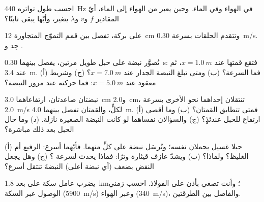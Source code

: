 \begin{exercise}[$\star$]\label{exo:g12:mechanical-waves:4}
احسب طول   تواتره \qty{440}{Hz} في الهواء وفي الماء.
وحين يعبر  من الهواء إلى الماء، أيّ المقادير $f$ و$v$
و$\lambda$ يتغير، وأيّها يبقى ثابتًا؟
\end{exercise}

\begin{exercise}[$\star$]\label{exo:g12:mechanical-waves:5}
على بركة، تفصل بين قمم التموّج المتجاورة \qty{12}{cm} وتتقدم الحلقات
بسرعة \qty{0.30}{m/s}. جِد   و
.
\end{exercise}

\begin{exercise}[$\star\star$]\label{exo:g12:mechanical-waves:6}
تُصوَّر نبضة على حبل طويل مرتين، يفصل بينهما \qty{0.30}{s}: فتقع
قمتها عند $x = \qty{1.0}{m}$، ثم عند \qty{3.4}{m}. (أ) فما السرعة؟
(ب) ومتى تبلغ النبضة الجدار عند $x = \qty{7.0}{m}$؟ (ج) وشريط معقود
عند $x = \qty{5.0}{m}$: فما حركته عند مرور النبضة؟
\end{exercise}

\begin{exercise}[$\star\star$]\label{exo:g12:mechanical-waves:7}
نبضتان صاعدتان، ارتفاعاهما \qty{3.0}{cm} و\qty{2.0}{cm}، تنتقلان
إحداهما نحو الأخرى بسرعة \qty{2.0}{m/s} لكلٍّ، والقمتان تفصل بينهما \qty{4.0}{m}.
(أ) فمتى تتطابق القمتان؟ (ب) وما أقصى ارتفاع للحبل عندئذٍ؟
(ج) والسؤالان نفساهما لو كانت النبضة الصغيرة نازلة. (د) وما حال الحبل بعد ذلك مباشرة؟
\end{exercise}

\begin{exercise}[$\star\star$]\label{exo:g12:mechanical-waves:8}
(أ) حبلا غسيل يحملان  نفسه؛ وتُرسَل نبضة على
كلٍّ منهما. فأيّهما أسرع: الرفيع أم الغليظ؟ ولماذا؟ (ب) ويشدّ
عازف قيثارة وترًا: فماذا يحدث لسرعة ؟ (ج) وهل يجعل النفض
بضعف  (أي نبضة أعلى) النبضةَ تنتقل أسرع؟
\end{exercise}

\begin{exercise}[$\star\star$]\label{exo:g12:mechanical-waves:9}
يضرب عامل سكة على بعد \qty{1.8}{km}؛ وأنت تصغي بأذن على
الفولاذ. احسب زمني الوصول عبر السكة (\qty{5900}{m/s})
وعبر الهواء (\qty{340}{m/s})، والفاصل بين الطرقتين.
\end{exercise}

